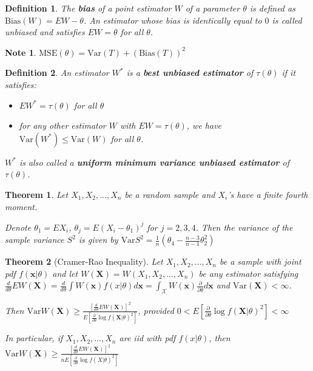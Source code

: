 \documentclass[14pt,twoside]{extreport}
\theoremstyle{dotless}
\newtheorem*{defn}{\footnotesize Definition}
\newtheorem*{thm}{\footnotesize Theorem} %
\newtheorem*{note}{\footnotesize Note} %
\begin{document}
\begin{defn}
    The \textbf{bias} of a point estimator $W$ of a parameter $\theta$ is defined as $\text{Bias}(W) = EW - \theta$. 
    An estimator whose bias is identically equal to $0$ is called unbiased and satisfies $EW = \theta$ for all $\theta$.
\end{defn}

\begin{note}
    $\text{MSE}(\theta) = \text{Var}(T) + (\text{Bias}(T))^2$
\end{note}

\begin{defn}
    An estimator $W^*$ is a \textbf{best unbiased estimator} of $\tau(\theta)$ if it satisfies:
    \begin{itemize}
        \item $EW^* = \tau(\theta)$ for all $\theta$
        \item for any other estimator $W$ with $EW = \tau(\theta)$, we have $\text{Var}(W^*) \leq \text{Var}(W)$ for all $\theta$.
    \end{itemize}
            $W^*$ is also called a \textbf{uniform minimum variance unbiased estimator} of $\tau(\theta)$.
\end{defn}

\begin{thm}
    Let $X_1, X_2, ..., X_n$ be a random sample and $X_i$'s have a finite fourth moment.

    Denote $\theta_1 = EX_i$, $\theta_j = E(X_i - \theta_1)^j$ for $j = 2, 3, 4$.
    Then the variance of the sample variance $S^2$ is given by $\text{Var}S^2 = \frac{1}{n} \left ( \theta_4 - \frac{n - 3}{n-1} \theta_2^2 \right )$
\end{thm}

\begin{thm}[Cramer-Rao Inequality]
    Let $X_1, X_2, ..., X_n$ be a sample with joint pdf $f(\bm{x} | \theta)$ and let $W(\bm{X}) = W(X_1, X_2, ..., X_n)$ be any estimator satisfying $\frac{d}{d\theta} EW(\bm{X}) = \frac{d}{d\theta} \int W(\bm{x}) f(x | \theta) d\bm{x} = \int_{\mathcal{X}} W(\bm{x}) \frac{\partial}{\partial \theta} d\bm{x}$ and $\text{Var}(\bm{X}) < \infty$.

    Then $\text{Var}W(\bm{X}) \geq \frac{[\frac{d}{d\theta} EW(\bm{X})]^2}{E[\frac{\partial}{\partial \theta} \log f(\bm{X}|\theta)^2]}$, provided $0 <  E[\frac{\partial}{\partial \theta} \log f(\bm{X}|\theta)^2] < \infty$

    In particular, if $X_1, X_2, ..., X_n$ are iid with pdf $f(x|\theta)$, then $\text{Var}W(\bm{X}) \geq \frac{[\frac{d}{d\theta} EW(\bm{X})]^2}{n E[\frac{\partial}{\partial \theta} \log f(X|\theta)^2]}$

\end{thm}
\end{document}

